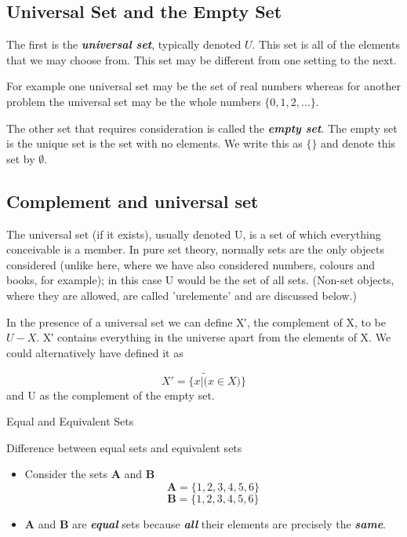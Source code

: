 \documentclass[12pt]{article}
\begin{document}
\subsection{Universal Set and the Empty Set}
The first is the \textbf{\textit{universal set}}, typically denoted $U$. This set is all of the elements that we may choose from. This set may be different from one setting to the next. 

For example one universal set may be the set of real numbers whereas for another problem the universal set may be the whole numbers $\{0, 1, 2,\ldots\}$.

The other set that requires consideration is called the \textit{\textbf{empty set}}. The empty set is the unique set is the set with no elements. We write this as $\{ \}$ and denote this set by $\emptyset$.





\subsection{Complement and universal set}

The universal set (if it exists), usually denoted U, is a set of which everything conceivable is a member. In pure set theory, normally sets are the only objects considered (unlike here, where we have also considered numbers, colours and books, for example); in this case U would be the set of all sets. (Non-set objects, where they are allowed, are called 'urelemente' and are discussed below.)

In the presence of a universal set we can define X′, the complement of X, to be $U−X$. X′ contains everything in the universe apart from the elements of X. We could alternatively have defined it as

\[X′ = \{x | \tilde (x\in X)\}\]
and U as the complement of the empty set.

{Equal and Equivalent Sets}

Difference between equal sets and equivalent sets

\begin{itemize}
	\item Consider the sets \textbf{A} and \textbf{B}
	\[ \boldsymbol{A} = \{ 1,2,3,4,5,6 \} \] 
	\[ \boldsymbol{B} = \{1,2,3,4,5,6 \} \]
	\item \textbf{A} and \textbf{B} are \textit{\textbf{equal}} sets because \textit{\textbf{all}} their
	elements are precisely the \textit{\textbf{same}}.
\end{itemize}
\end{document}
